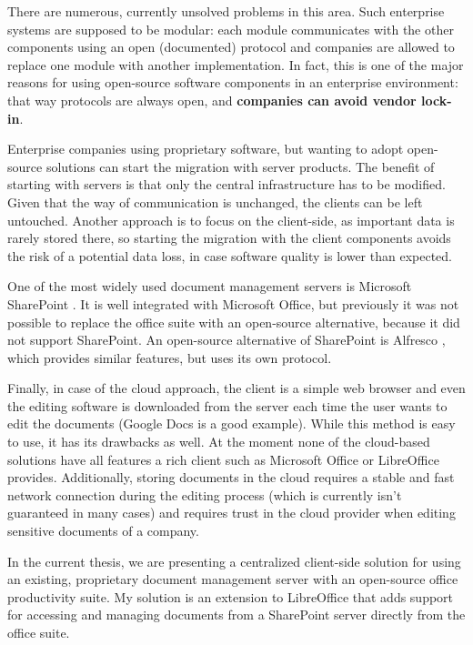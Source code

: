 There are numerous, currently unsolved problems in this area. Such enterprise
systems are supposed to be modular: each module communicates with the other
components using an open (documented) protocol and companies are allowed to replace one
module with another implementation. In fact, this is one of the major reasons for using open-source
software components in an enterprise environment: that way protocols are always
open, and \textbf{companies can avoid vendor lock-in}.

Enterprise companies using proprietary software, but wanting to adopt
open-source solutions can start the migration with server products. The benefit
of starting with servers is that only the central infrastructure has to be
modified. Given that the way of communication is unchanged, the clients can be left
untouched. Another approach is to focus on the client-side, as important data
is rarely stored there, so starting the migration with the client components
avoids the risk of a potential data loss, in case software quality is lower
than expected.

One of the most widely used document management servers is Microsoft
SharePoint \cite{sharepoint}. It is well integrated with Microsoft Office, but
previously it was not possible to replace the office suite with an open-source
alternative, because it did not support SharePoint. An open-source alternative
of SharePoint is Alfresco \cite{alfresco}, which provides similar features, but
uses its own protocol.

Finally, in case of the cloud approach, the client is a simple web browser and
even the editing software is downloaded from the server each time the user
wants to edit the documents (Google Docs \cite{google-docs} is a good example).
While this method is easy to use, it has its drawbacks as well. At the moment
none of the cloud-based solutions have all features a rich client such as
Microsoft Office or LibreOffice provides.  Additionally, storing documents in
the cloud requires a stable and fast network connection during the editing
process (which is currently isn't guaranteed in many cases) and requires trust
in the cloud provider when editing sensitive documents of a company.

In the current thesis, we are presenting a centralized client-side solution for
using an existing, proprietary document management server with an open-source
office productivity suite. My solution is an extension to LibreOffice that adds
support for accessing and managing documents from a SharePoint server directly
from the office suite.

